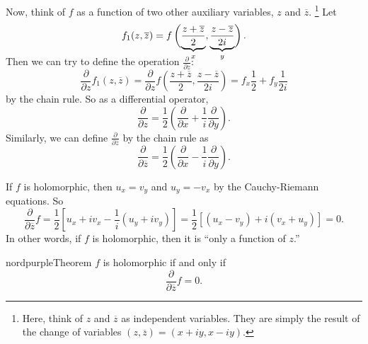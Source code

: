 Now, think of $f$ as a function of two other auxiliary
variables, $z$ and $\overline{z}$.
\footnote{Here, think of $z$ and $\overline{z}$ as
  independent variables. They are simply the result of
  the change of variables
  $(z, \overline{z}) = (x + iy, x - iy)$.}
Let
\[
  f_1(z, \overline{z}) = f\left(\smash[b]{\underbrace{\frac{z + \overline{z}}{2}}_{x}}, \smash[b]{\underbrace{\frac{z - \overline{z}}{2i}}_{y}}\right)
.\]
Then we can try to define the operation
$\frac{\partial}{\partial z}$:
\[
\frac{\partial}{\partial z} f_1(z, \overline{z}) =
\frac{\partial}{\partial z} f\left(\frac{z + \overline{z}}{2}, \frac{z - \overline{z}}{2i}\right) =
f_x \frac{1}{2} + f_y \frac{1}{2i}
\]
by the chain rule. So as a differential operator,
\[
\frac{\partial}{\partial z} = \frac{1}{2} \left(\frac{\partial}{\partial x} + \frac{1}{i} \frac{\partial}{\partial y}\right)
.\]
Similarly, we can define
$\frac{\partial}{\partial \overline{z}}$ by the chain rule
as
\[
\frac{\partial}{\partial \overline{z}} = \frac{1}{2} \left(\frac{\partial}{\partial x} - \frac{1}{i}\frac{\partial}{\partial y}\right)
.\]

If $f$ is holomorphic, then $u_x = v_y$ and $u_y = -v_x$
by the Cauchy-Riemann equations. So
\[
\frac{\partial}{\partial \overline{z}} f = \frac{1}{2}\left[u_x + iv_x - \frac{1}{i}(u_y + iv_y)\right]
= \frac{1}{2}\left[(u_x - v_y) + i(v_x + u_y)\right] = 0
.\]
In other words, if $f$ is holomorphic, then it is
``only a function of $z$.''

\begin{mybox}{nordpurple}{Theorem}
  $f$ is holomorphic if and only if
  \[
  \frac{\partial}{\partial \overline{z}} f = 0
  .\]
\end{mybox}
